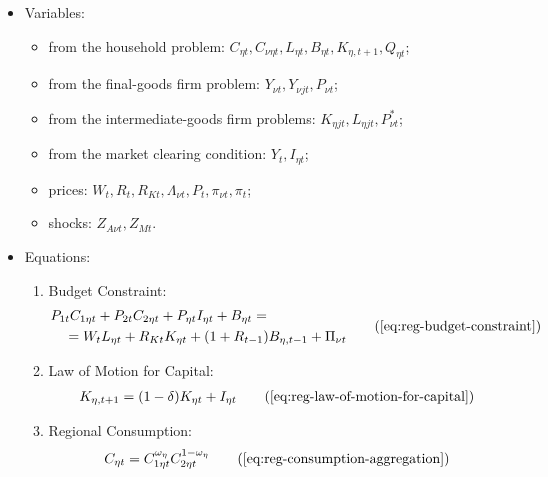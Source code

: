 \documentclass[
thesis.tex
]{subfiles}
\begin{document}
{\singlespacing
	
	\begin{itemize}

		\item Variables:
		
	\begin{itemize}
	
		\item from the household problem: $C_{\eta t}, C_{\nu \eta t}, L_{\eta t}, B_{\eta t}, K_{\eta, t+1}, Q_{\eta t}$;
	
		\item from the final-goods firm problem: $Y_{\nu t}, Y_{\nu jt}, P_{\nu t}$;
	
		\item from the intermediate-goods firm problems: $K_{\eta jt}, L_{\eta jt}, P_{\nu t}^\ast$;
	
		\item from the market clearing condition: $Y_t, I_{\eta t}$;
	
		\item prices: $W_t, R_t, R_{Kt}, \Lambda_{\nu t}, P_t, \pi_{\nu t}, \pi_t$;
	
		\item shocks: $Z_{A\nu t}, Z_{Mt}$.
	
	\end{itemize}

		\item Equations:
		
	\begin{enumerate}

		\item Budget Constraint: 
		\begin{align}
		\begin{split}
			& P_{1t} C_{1\eta t} + P_{2t} C_{2\eta t} + P_{\eta t} I_{\eta t} + B_{\eta t} = \\ & \quad = W_t L_{\eta t} + R_{Kt} K_{\eta t} + (1 + R_{t-1}) B_{\eta,t-1} + \Pi_{\nu t}
		\end{split} \tag{\ref{eq:reg-budget-constraint}}
		\end{align}

		\item Law of Motion for Capital:
		\begin{align}
			K_{\eta, t+1} = (1-\delta)K_{\eta t} + I_{\eta t} \tag{\ref{eq:reg-law-of-motion-for-capital}}
		\end{align}

		\item Regional Consumption:
		\begin{align}
			C_{\eta t} = C_{1\eta t}^{\omega_{\eta}} C_{2\eta t}^{1-\omega_{\eta}} \tag{\ref{eq:reg-consumption-aggregation}}
		\end{align}


\end{enumerate}
\end{itemize}}
\end{document}
